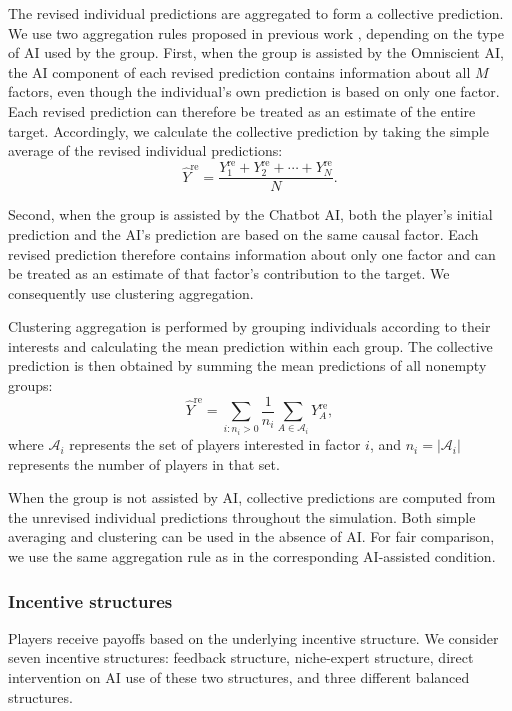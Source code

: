 \documentclass[12pt]{article}
\begin{document}
The revised individual predictions are aggregated to form a collective prediction. We use two aggregation rules proposed in previous work \citep{wang2025individual}, depending on the type of AI used by the group.
First, when the group is assisted by the Omniscient AI, the AI component of each revised prediction contains information about all $M$ factors, even though the individual's own prediction is based on only one factor. Each revised prediction can therefore be treated as an estimate of the entire target. Accordingly, we calculate the collective prediction by taking the simple average of the revised individual predictions:
\begin{equation}
\hat{Y}^{\mathrm{re}} = \frac{Y_1^{\mathrm{re}} + Y_2^{\mathrm{re}} + \cdots + Y_N^{\mathrm{re}}}{N}.
\end{equation}

Second, when the group is assisted by the Chatbot AI, both the player's initial prediction and the AI's prediction are based on the same causal factor. Each revised prediction therefore contains information about only one factor and can be treated as an estimate of that factor's contribution to the target. We consequently use clustering aggregation.

Clustering aggregation is performed by grouping individuals according to their interests and calculating the mean prediction within each group. The collective prediction is then obtained by summing the mean predictions of all nonempty groups:
\begin{equation}
\hat{Y}^{\mathrm{re}} = \sum_{i:n_i>0} \frac{1}{n_i} \sum_{A\in\mathcal{A}_i} Y_A^{\mathrm{re}},
\end{equation}
where $\mathcal{A}_i$ represents the set of players interested in factor $i$, and $n_i=|\mathcal{A}_i|$ represents the number of players in that set.

When the group is not assisted by AI, collective predictions are computed from the unrevised individual predictions throughout the simulation. Both simple averaging and clustering can be used in the absence of AI. For fair comparison, we use the same aggregation rule as in the corresponding AI-assisted condition.


\subsubsection*{Incentive structures}

Players receive payoffs based on the underlying incentive structure. 
We consider seven incentive structures: feedback structure, niche-expert structure, direct intervention on AI use of these two structures, and three different balanced structures.
\end{document}
